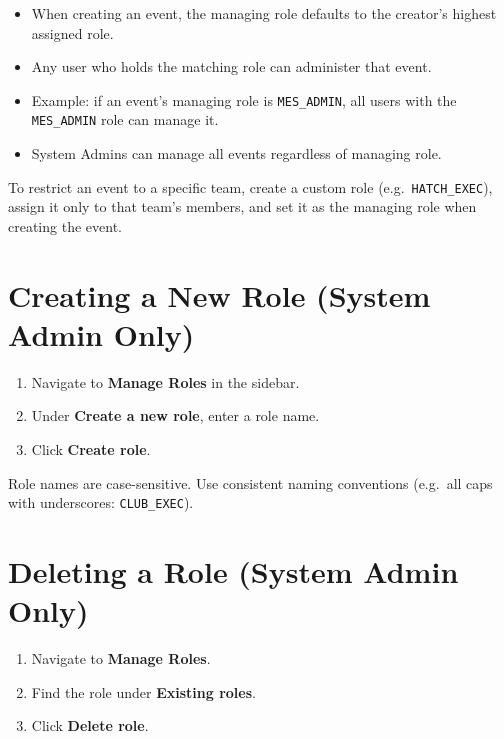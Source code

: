 \documentclass[12pt, twoside]{report}
\newcommand{\uielem}[1]{\textbf{#1}}
\begin{document}
\begin{itemize}
  \item When creating an event, the managing role defaults to the creator's
        highest assigned role.
  \item Any user who holds the matching role can administer that event.
  \item Example: if an event's managing role is \texttt{MES\_ADMIN},
        all users with the \texttt{MES\_ADMIN} role can manage it.
  \item System Admins can manage all events regardless of managing role.
\end{itemize}

\begin{tipbox}
To restrict an event to a specific team, create a custom role
(e.g.\ \texttt{HATCH\_EXEC}), assign it only to that team's members,
and set it as the managing role when creating the event.
\end{tipbox}

\section{Creating a New Role (System Admin Only)}

\begin{enumerate}
  \item Navigate to \uielem{Manage Roles} in the sidebar.
  \item Under \uielem{Create a new role}, enter a role name.
  \item Click \uielem{Create role}.
\end{enumerate}

\begin{notebox}
Role names are case-sensitive. Use consistent naming conventions
(e.g.\ all caps with underscores: \texttt{CLUB\_EXEC}).
\end{notebox}

\section{Deleting a Role (System Admin Only)}

\begin{enumerate}
  \item Navigate to \uielem{Manage Roles}.
  \item Find the role under \uielem{Existing roles}.
  \item Click \uielem{Delete role}.
\end{enumerate}
\end{document}
